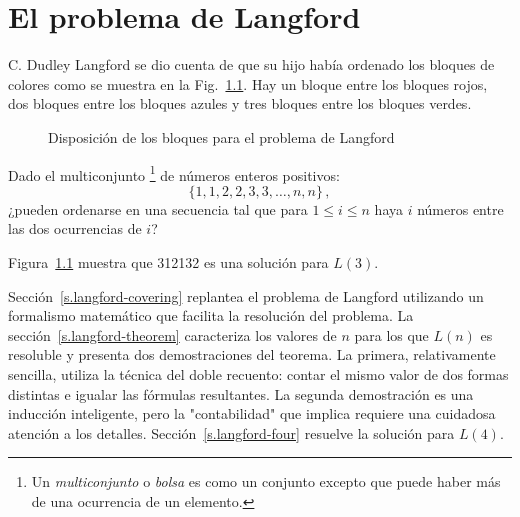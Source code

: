 
\chapter{El problema de Langford}\label{c.langford}


C. Dudley Langford se dio cuenta de que su hijo había ordenado los bloques de colores como se muestra en la Fig.~\ref{f.langford}.
Hay un bloque entre los bloques rojos, dos bloques entre los bloques azules y tres bloques entre los bloques verdes. 

\begin{figure}[ht]
\begin{center}
\end{center}
\caption{Disposición de los bloques para el problema de Langford}\label{f.langford}
\end{figure}

\begin{definition} Dado el multiconjunto \footnote{Un \emph{multiconjunto} o \emph{bolsa} es como un conjunto excepto que puede haber más de una ocurrencia de un elemento.} de números enteros positivos:
\[
\{1,1,2,2,3,3,\ldots,n,n\}\,,
\]
¿pueden ordenarse en una secuencia tal que para $1\leq i \leq n$ haya $i$ números entre las dos ocurrencias de $i$?
\end{definition}

Figura~\ref{f.langford} muestra que 312132 es una solución para $L(3)$.

Sección~\ref{s.langford-covering} replantea el problema de Langford utilizando un formalismo matemático que facilita la resolución del problema. La sección~\ref{s.langford-theorem} caracteriza los valores de $n$ para los que $L(n)$ es resoluble y presenta dos demostraciones del teorema. La primera, relativamente sencilla, utiliza la técnica del doble recuento: contar el mismo valor de dos formas distintas e igualar las fórmulas resultantes. La segunda demostración es una inducción inteligente, pero la "contabilidad" que implica requiere una cuidadosa atención a los detalles. Sección~\ref{s.langford-four} resuelve la solución para $L(4)$.

